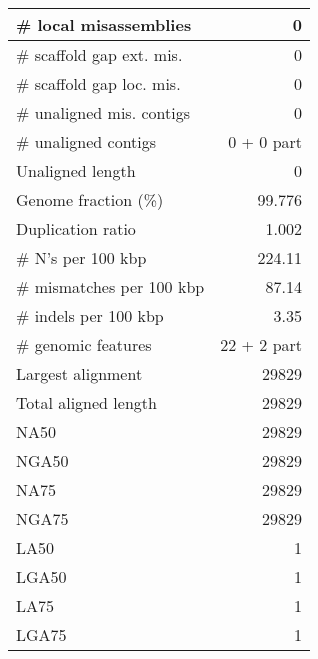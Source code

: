 \documentclass[12pt,a4paper]{article}
\begin{document}
\begin{table}[ht]
\begin{center}
\begin{tabular}{|l*{1}{|r}|}
\# local misassemblies & 0 \\ \hline
\# scaffold gap ext. mis. & 0 \\ \hline
\# scaffold gap loc. mis. & 0 \\ \hline
\# unaligned mis. contigs & 0 \\ \hline
\# unaligned contigs & 0 + 0 part \\ \hline
Unaligned length & 0 \\ \hline
Genome fraction (\%) & 99.776 \\ \hline
Duplication ratio & 1.002 \\ \hline
\# N's per 100 kbp & 224.11 \\ \hline
\# mismatches per 100 kbp & 87.14 \\ \hline
\# indels per 100 kbp & 3.35 \\ \hline
\# genomic features & 22 + 2 part \\ \hline
Largest alignment & 29829 \\ \hline
Total aligned length & 29829 \\ \hline
NA50 & 29829 \\ \hline
NGA50 & 29829 \\ \hline
NA75 & 29829 \\ \hline
NGA75 & 29829 \\ \hline
LA50 & 1 \\ \hline
LGA50 & 1 \\ \hline
LA75 & 1 \\ \hline
LGA75 & 1 \\ \hline
\end{tabular}
\end{center}
\end{table}
\end{document}
